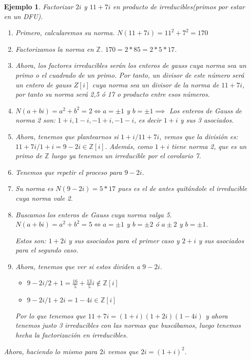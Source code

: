 \documentclass[11pt, a4paper, titlepage]{article}
\providecommand{\ent}{\mathbb{Z}}
\theoremstyle{theorem-style}
\theoremstyle{definition-style}
\theoremstyle{remark-style}
\theoremstyle{example-style}
\newtheorem*{ejemplo}{Ejemplo}
\begin{document}
\begin{ejemplo}
	Factorizar $2i$ y $11+7i$ en producto de irreducibles(primos por estar en un DFU).
	
	\begin{enumerate}
	\item Primero, calcularemos su norma. $N(11+7i) = 11^2 + 7^2 = 170$
	\item Factorizamos la norma en $\ent$. $170 = 2*85 = 2*5 *17$.
	\item Ahora, los factores irreducibles serán los enteros de gauss cuya norma sea un primo o el cuadrado de un primo. Por tanto, un divisor de este número será un entero de gauss $Z[i]$ cuya norma sea un divisor de la norma de $11+7i$, por tanto su norma será 2,5 ó 17 o producto entre esos números.
	\item  $N(a+bi) = a^2 +b^2 = 2 \iff a=\pm 1$ y $b= \pm 1\implies$ Los enteros de Gauss de norma 2 son: $1+i,1-i,-1+i,-1-i$, es decir $1+i$ y sus 3 asociados.
	\item Ahora, tenemos que plantearnos si $1+i / 11+7i$, vemos que la división es: $11+7i/1+i = 9-2i\in \ent[i]$. Además, como $1+i$ tiene norma 2, que es un primo de $\ent$ luego ya tenemos un irreducible por el corolario 7. 
	\item Tenemos que repetir el proceso para $9-2i$.
	\item Su norma es $N(9-2i) = 5*17$ pues es el de antes quitándole el irreducible cuya norma vale 2.
	\item Buscamos los enteros de Gauss cuya norma valga 5. $N(a+bi) = a^2 +b^2 = 5 \iff a = \pm 1$ y $b =\pm 2$ ó $a \pm 2$ y $b = \pm 1$.
	
	Estos son: $1+2i$ y sus asociados para el primer caso y $2+i$ y sus asociados para el segundo caso.
	
	\item Ahora, tenemos que ver si estos dividen a $9-2i$. 
	\begin{itemize}
	\item $9-2i/2+1  = \frac{16}{5} + \frac{13}{5}i \notin \ent[i]$
	\item $9-2i /1+2i = 1-4i \in \ent[i]$
\end{itemize}

Por lo que tenemos que $11+7i = (1+i)(1+2i)(1-4i)$ y ahora tenemos justo 3 irreducibles con las normas que buscábamos, luego tenemos hecha la factorización en irreducibles.
	
\end{enumerate}

Ahora, haciendo lo mismo para $2i$ vemos que $2i = (1+i)^2$.

	
\end{ejemplo}
\end{document}
